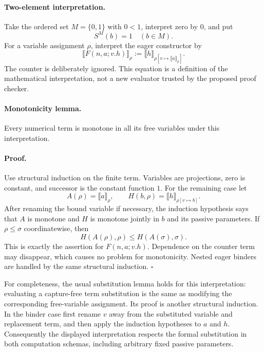 \paragraph{Two-element interpretation.}
Take the ordered set $M=\{0,1\}$ with $0<1$, interpret zero by $0$, and put
\[
                         S^M(b)=1\quad(b\in M).
\]
For a variable assignment $\rho$, interpret the eager constructor by
\[
 \llbracket F(n,a;v.h)\rrbracket_\rho
   :=\llbracket h\rrbracket_{\rho[v\mapsto\llbracket a\rrbracket_\rho]}.
 \tag{Eager interpretation}
\]
The counter is deliberately ignored.  This equation is a definition of
the mathematical interpretation, not a new evaluator trusted by the
proposed proof checker.

\paragraph{Monotonicity lemma.}
Every numerical term is monotone in all its free variables under this
interpretation.

\paragraph{Proof.}
Use structural induction on the finite term.  Variables are projections,
zero is constant, and successor is the constant function $1$.  For the
remaining case let
\[
 A(\rho)=\llbracket a\rrbracket_\rho,
 \qquad H(b,\rho)=\llbracket h\rrbracket_{\rho[v\mapsto b]}.
\]
After renaming the bound variable if necessary, the induction hypothesis
says that $A$ is monotone and $H$ is monotone jointly in $b$ and its passive
parameters.  If $\rho\le\sigma$ coordinatewise, then
\[
 H(A(\rho),\rho)\le H(A(\sigma),\sigma).
\]
This is exactly the assertion for $F(n,a;v.h)$.  Dependence on the
counter term may disappear, which causes no problem for monotonicity.
Nested eager binders are handled by the same structural induction.
\hfill$\square$

For completeness, the usual substitution lemma holds for this
interpretation: evaluating a capture-free term substitution is the same
as modifying the corresponding free-variable assignment.  Its proof is
another structural induction.  In the binder case first rename $v$ away
from the substituted variable and replacement term, and then apply the
induction hypotheses to $a$ and $h$.  Consequently the displayed
interpretation respects the formal substitution in both computation
schemas, including arbitrary fixed passive parameters.

